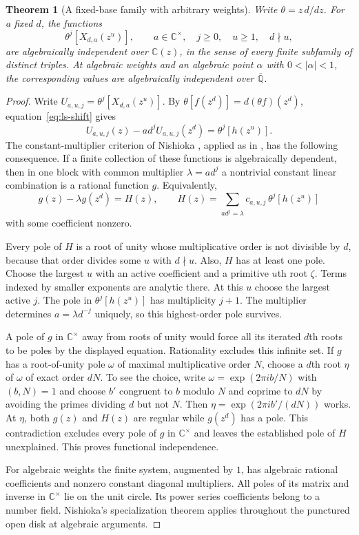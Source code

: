 \documentclass[11pt,a4paper]{article}
\newtheorem{theorem}{Theorem}[section]
\theoremstyle{definition}
\theoremstyle{remark}
\numberwithin{equation}{section}
\begin{document}
\begin{theorem}[A fixed-base family with arbitrary weights]\label{thm:weightedlambert}
Write $\theta=z\,d/dz$. For a fixed $d$, the functions
\[
 \theta^j\!\left[X_{d,a}(z^u)\right],\qquad
       a\in\mathbb C^\times,\quad j\ge0,\quad u\ge1,\quad d\nmid u,
\]
are algebraically independent over $\mathbb C(z)$, in the sense of
every finite subfamily of distinct triples. At algebraic weights and
an algebraic point $\alpha$ with $0<|\alpha|<1$, the corresponding
values are algebraically independent over $\overline{\mathbb Q}$.
\end{theorem}

\begin{proof}
Write $U_{a,u,j}=\theta^j[X_{d,a}(z^u)]$. By
$\theta[f(z^d)]=d(\theta f)(z^d)$, equation~\eqref{eq:ls-shift} gives
\[
 U_{a,u,j}(z)-ad^jU_{a,u,j}(z^d)=\theta^j[h(z^u)].
\]
The constant-multiplier criterion of Nishioka
\cite[Theorems 3.2.1 and 3.2.2]{sn-nish}, applied as in
\cite[Section 3]{sn-bvmahler}, has the following consequence.
If a finite collection of these functions is algebraically dependent,
then in one block with common multiplier $\lambda=ad^j$ a nontrivial
constant linear combination is a rational function $g$. Equivalently,
\[
 g(z)-\lambda g(z^d)=H(z),\qquad
 H(z)=\sum_{ad^j=\lambda}c_{a,u,j}\,\theta^j[h(z^u)]
\]
with some coefficient nonzero.

Every pole of $H$ is a root of unity whose multiplicative order is
not divisible by $d$, because that order divides some $u$ with $d\nmid u$. Also, $H$
has at least one pole. Choose the largest $u$ with an active
coefficient and a primitive $u$th root $\zeta$. Terms indexed by
smaller exponents are analytic there. At this $u$ choose the largest
active $j$. The pole in $\theta^j[h(z^u)]$ has multiplicity $j+1$.
The multiplier determines $a=\lambda d^{-j}$ uniquely, so this
highest-order pole survives.

A pole of $g$ in $\mathbb C^\times$ away from roots of unity would
force all its iterated $d$th roots to be poles by the displayed
equation. Rationality excludes this infinite set. If $g$ has a
root-of-unity pole $\omega$ of maximal multiplicative order $N$, choose
a $d$th root $\eta$ of $\omega$ of exact order $dN$. To see the choice,
write $\omega=\exp(2\pi i b/N)$ with $(b,N)=1$ and choose $b'$ congruent
to $b$ modulo $N$ and coprime to $dN$ by avoiding the primes dividing
$d$ but not $N$. Then $\eta=\exp(2\pi i b'/(dN))$ works. At $\eta$,
both $g(z)$ and $H(z)$ are regular while $g(z^d)$ has a pole. This
contradiction excludes every pole of $g$ in $\mathbb C^\times$ and
leaves the established pole of $H$ unexplained. This proves functional
independence.

For algebraic weights the finite system, augmented by $1$, has
algebraic rational coefficients and nonzero constant diagonal
multipliers. All poles of its matrix and inverse in $\mathbb C^\times$
lie on the unit circle. Its power series coefficients belong to a
number field. Nishioka's specialization theorem
\cite[Theorem 4.2.1]{sn-nish} applies throughout the punctured open
disk at algebraic arguments.
\end{proof}
\end{document}

